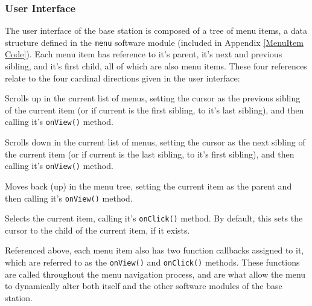 \documentclass[journal,compsoc]{IEEEtran}
\begin{document}
\subsubsection{User Interface}

The user interface of the base station is composed of a tree of menu items, a data structure defined in the \lstinline[columns=fixed]{menu} software module (included in Appendix \ref{MenuItem Code}). Each menu item has reference to it's parent, it's next and previous sibling, and it's first child, all of which are also menu items. These four references relate to the four cardinal directions given in the user interface:

\begin{LaTeXdescription}
	\item[Up] Scrolls up in the current list of menus, setting the cursor as the previous sibling of the current item (or if current is the first sibling, to it's last sibling), and then calling it's \lstinline[columns=fixed]{onView()} method.
    \item[Down] Scrolls down in the current list of menus, setting the cursor as the next sibling of the current item (or if current is the last sibling, to it's first sibling), and then calling it's \lstinline[columns=fixed]{onView()} method.
    \item[Left] Moves back (up) in the menu tree, setting the current item as the parent and then calling it's \lstinline[columns=fixed]{onView()} method.
    \item[Right] Selects the current item, calling it's \lstinline[columns=fixed]{onClick()} method. By default, this sets the cursor to the child of the current item, if it exists.
\end{LaTeXdescription}

Referenced above, each menu item also has two function callbacks assigned to it, which are referred to as the \lstinline[columns=fixed]{onView()} and \lstinline[columns=fixed]{onClick()} methods. These functions are called throughout the menu navigation process, and are what allow the menu to dynamically alter both itself and the other software modules of the base station. 
\end{document}
